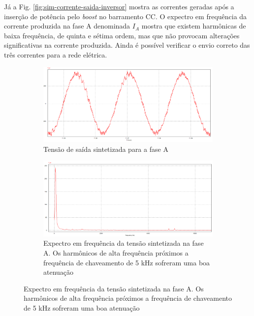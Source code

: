 Já a Fig. \ref{fig:sim-corrente-saida-inversor} mostra as correntes geradas após a inserção de potência pelo \textit{boost} no barramento CC.
O expectro em frequência da corrente produzida na fase A denominada $I_A$ mostra que existem harmônicas de baixa frequência, de quinta e sétima ordem, mas que não provocam alterações significativas na corrente produzida.
Ainda é possível verificar o envio correto das três correntes para a rede elétrica.

\begin{figure}[!hbt]
	\centering
	\begin{subfigure}[b]{\textwidth}
		\centering
		\includegraphics[width=\textwidth]{figuras/sim_figures/sistema_completo/tensao_saida_inversor_2.PNG}
		\caption{Tensão de saída sintetizada para a fase A}
   \end{subfigure}

   \begin{subfigure}[b]{\textwidth}
		\centering
		\includegraphics[width=\textwidth]{figuras/sim_figures/sistema_completo/tensao_saida_inversor_fft.PNG}
		\caption{Expectro em frequência da tensão sintetizada na fase A. Os harmônicos de alta frequência próximos a frequência de chaveamento de 5 kHz sofreram uma boa atenuação}
   \end{subfigure}


\end{figure}
